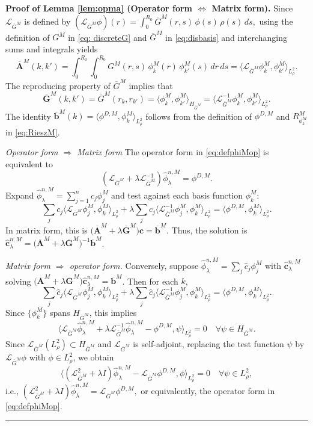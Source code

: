 \documentclass[12pt]{article}
\def\Gbar{ {\overline{G}} }
\def\Abar{ {\overline{A}} }
\def\bbar{ {\overline{b}} }
\newenvironment{proof}[1][Proof]{\noindent\textbf{#1.} }{\ \rule{0.5em}{0.5em}}
\numberwithin{equation}{section}
\numberwithin{theorem}{section}
\begin{document}
\begin{proof}[Proof of Lemma \ref{lem:opma} (Operator form $\Leftrightarrow$ Matrix form)]
Since $\mathcal{L}_{\Gbar^M}$ is defined by $
(\mathcal{L}_{\Gbar^M}\phi)(r)
= \int_0^{R_0} \Gbar^M(r,s)\,\phi(s)\,\rho(s)\,ds,
$ 
using the definition of $G^M$ in \eqref{eq: discreteG} and $\Gbar^M$ in \eqref{eq:disbasis} and interchanging sums and integrals yields 
$$
\mathbf{\Abar}^M(k, k')
= \int_0^{R_0}\!\!\int_0^{R_0} G^M(r,s)\,\phi_k^M(r)\,\phi_{k'}^M(s)\,dr\,ds
= \langle \mathcal{L}_{\Gbar^M}\phi_k^M,\phi_{k'}^M\rangle_{L_\rho^2}.
$$
The reproducing property of $\Gbar^M$ implies that 
$$
\mathbf{\Gbar}^M(k,k')
= \Gbar^M(r_k,r_{k'})
= \langle \phi_k^M,\phi_{k'}^M\rangle_{H_{\Gbar^M}}
= \langle \mathcal{L}_{\Gbar^M}^{-1}\phi_k^M,\phi_{k'}^M\rangle_{L_\rho^2}.
$$
The identity $\mathbf{\bbar} ^M(k)
= \langle \phi^{D,M},\phi_k^M\rangle_{L_\rho^2}$ follows from the definition of $\phi^{D,M}$ and $R_{\phi_k^M}^M$ in \eqref{eq:RieszM}.

\noindent\emph{Operator form $\Rightarrow$ Matrix form} The operator form  in \eqref{eq:defphiMop} is equivalent to 
$$
(\mathcal{L}_{\Gbar^M} + \lambda \mathcal{L}_{\Gbar^M}^{-1})\hat\phi_\lambda^{n,M}
= \phi^{D,M}.
$$
Expand $\hat\phi_\lambda^{n,M} = \sum_{j=1}^n c_j\phi_j^M$ and test against each basis function $\phi_k^M$:
$$
\sum_j c_j\langle \mathcal{L}_{\Gbar^M}\phi_j^M,\phi_k^M\rangle_{L_\rho^2}
+ \lambda \sum_j c_j\langle \mathcal{L}_{\Gbar^M}^{-1}\phi_j^M,\phi_k^M\rangle_{L_\rho^2}
= \langle \phi^{D,M},\phi_k^M\rangle_{L_\rho^2}.
$$
In matrix form, this is $\bigl(\mathbf{\Abar}^M + \lambda \mathbf{\Gbar}^M\bigr)\mathbf c
= \mathbf{\bbar} ^M$. Thus, the solution is  
$ 
\hat{\mathbf c}_\lambda^{n,M}
= \bigl(\mathbf{\Abar}^M + \lambda \mathbf{\Gbar}^M\bigr)^{-1}\mathbf{\bbar} ^M
$. 

\noindent\emph{Matrix form $\Rightarrow$ operator form. }
Conversely, suppose $\hat\phi_\lambda^{n,M} = \sum_j \hat c_j \phi_j^M$ with $\hat{\mathbf c}_\lambda^{n,M}$ solving $
\bigl(\mathbf{\Abar}^M + \lambda \mathbf{\Gbar}^M\bigr)\hat{\mathbf c}_\lambda^{n,M}
= \mathbf{\bbar} ^M$. 
Then for each $k$,
$$
\sum_j \hat c_j\langle \mathcal{L}_{\Gbar^M}\phi_j^M,\phi_k^M\rangle_{L_\rho^2}
+ \lambda \sum_j \hat c_j\langle \mathcal{L}_{\Gbar^M}^{-1}\phi_j^M,\phi_k^M\rangle_{L_\rho^2}
= \langle \phi^{D,M},\phi_k^M\rangle_{L_\rho^2}. 
$$
Since $\{\phi_k^M\}$ spans $H_{\Gbar^M}$, this implies
$$
\langle \mathcal{L}_{\Gbar^M}\hat\phi_\lambda^{n,M}
+ \lambda \mathcal{L}_{\Gbar^M}^{-1}\hat\phi_\lambda^{n,M}
- \phi^{D,M},\psi\rangle_{L_\rho^2} = 0
\quad\forall \psi\in H_{\Gbar^M}.
$$
Since $\mathcal{L}_{\bar{G}^M}(L^2_\rho)  \subset H_{\bar{G}^M}$ and $\mathcal{L}_{\Gbar^M}$ is self-adjoint, replacing the test function $\psi $ by $\mathcal{L}_{\Gbar^M}\phi$ with $\phi\in L^2_\rho$,  we obtain  
$$
\langle  ( \mathcal{L}_{\Gbar^M}^2 
+ \lambda I ) \hat\phi_\lambda^{n,M}
- \mathcal{L}_{\Gbar^M} \phi^{D,M},\phi\rangle_{L_\rho^2} = 0
\quad\forall \psi\in L^2_\rho, 
$$ 
i.e., $
(\mathcal{L}_{\Gbar^M}^2 + \lambda I)\hat\phi_\lambda^{n,M}
= \mathcal{L}_{\Gbar^M}\phi^{D,M},
$
or equivalently, the operator form in \eqref{eq:defphiMop}. 
\end{proof}
\end{document}
